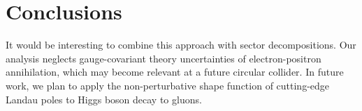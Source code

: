 \section{Conclusions}\label{sec:conclusions}

It would be interesting to combine this approach with sector
decompositions. Our analysis neglects gauge-covariant theory
uncertainties of electron-positron annihilation, which may become
relevant at a future circular collider. In future work, we plan to apply
the non-perturbative shape function of cutting-edge Landau poles to
Higgs boson decay to gluons.


